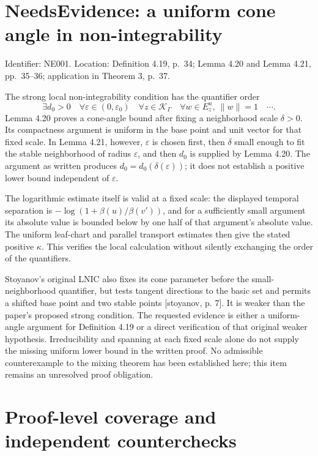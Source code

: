 \documentclass[10pt]{article}
\begin{document}
\section*{NeedsEvidence: a uniform cone angle in non-integrability}
Identifier: NE001. Location: Definition 4.19, p. 34; Lemma 4.20 and Lemma 4.21, pp. 35–36; application in Theorem 3, p. 37.\par
The strong local non-integrability condition has the quantifier order \[\exists d_0>0\quad
 \forall\varepsilon\in(0,\varepsilon_0)\quad
 \forall z\in\mathcal K_\Gamma\quad
 \forall w\in E^u_z,\ \|w\|=1\quad\cdots.\] Lemma 4.20 proves a cone-angle bound after fixing a neighborhood scale \(\delta>0\). Its compactness argument is uniform in the base point and unit vector for that fixed scale. In Lemma 4.21, however, \(\varepsilon\) is chosen first, then \(\delta\) small enough to fit the stable neighborhood of radius \(\varepsilon\), and then \(d_0\) is supplied by Lemma 4.20. The argument as written produces \(d_0=d_0(\delta(\varepsilon))\); it does not establish a positive lower bound independent of \(\varepsilon\).\par
The logarithmic estimate itself is valid at a fixed scale: the displayed temporal separation is \(-\log(1+\beta(u)/\beta(v'))\), and for a sufficiently small argument its absolute value is bounded below by one half of that argument’s absolute value. The uniform leaf-chart and parallel transport estimates then give the stated positive \(\kappa\). This verifies the local calculation without silently exchanging the order of the quantifiers.\par
Stoyanov’s original LNIC also fixes its cone parameter before the small-neighborhood quantifier, but tests tangent directions to the basic set and permits a shifted base point and two stable points [stoyanov, p. 7]. It is weaker than the paper’s proposed strong condition. The requested evidence is either a uniform-angle argument for Definition 4.19 or a direct verification of that original weaker hypothesis. Irreducibility and spanning at each fixed scale alone do not supply the missing uniform lower bound in the written proof. No admissible counterexample to the mixing theorem has been established here; this item remains an unresolved proof obligation.\par
\section*{Proof-level coverage and independent counterchecks}
\end{document}
